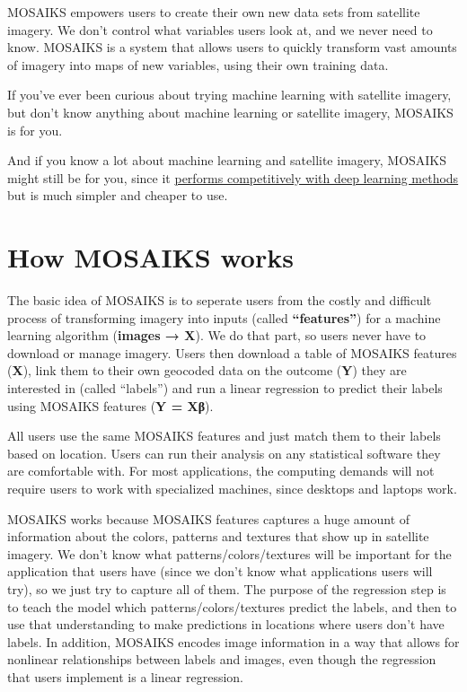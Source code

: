 \documentclass[
  letterpaper,
  DIV=11,
  numbers=noendperiod]{scrreprt}
\begin{document}
MOSAIKS empowers users to create their own new data sets from satellite
imagery. We don't control what variables users look at, and we never
need to know. MOSAIKS is a system that allows users to quickly transform
vast amounts of imagery into maps of new variables, using their own
training data.

If you've ever been curious about trying machine learning with satellite
imagery, but don't know anything about machine learning or satellite
imagery, MOSAIKS is for you.

And if you know a lot about machine learning and satellite imagery,
MOSAIKS might still be for you, since it
\href{https://www.nature.com/articles/s41467-021-24638-z/figures/3}{performs
competitively with deep learning methods} but is much simpler and
cheaper to use.

\hypertarget{how-mosaiks-works}{%
\section{How MOSAIKS works}\label{how-mosaiks-works}}

The basic idea of MOSAIKS is to seperate users from the costly and
difficult process of transforming imagery into inputs (called
\textbf{``features''}) for a machine learning algorithm (\textbf{images
→ X}). We do that part, so users never have to download or manage
imagery. Users then download a table of MOSAIKS features (\textbf{X}),
link them to their own geocoded data on the outcome (\textbf{Y}) they
are interested in (called ``labels'') and run a linear regression to
predict their labels using MOSAIKS features (\textbf{Y = Xβ}).

All users use the same MOSAIKS features and just match them to their
labels based on location. Users can run their analysis on any
statistical software they are comfortable with. For most applications,
the computing demands will not require users to work with specialized
machines, since desktops and laptops work.

MOSAIKS works because MOSAIKS features captures a huge amount of
information about the colors, patterns and textures that show up in
satellite imagery. We don't know what patterns/colors/textures will be
important for the application that users have (since we don't know what
applications users will try), so we just try to capture all of them. The
purpose of the regression step is to teach the model which
patterns/colors/textures predict the labels, and then to use that
understanding to make predictions in locations where users don't have
labels. In addition, MOSAIKS encodes image information in a way that
allows for nonlinear relationships between labels and images, even
though the regression that users implement is a linear regression.
\end{document}
